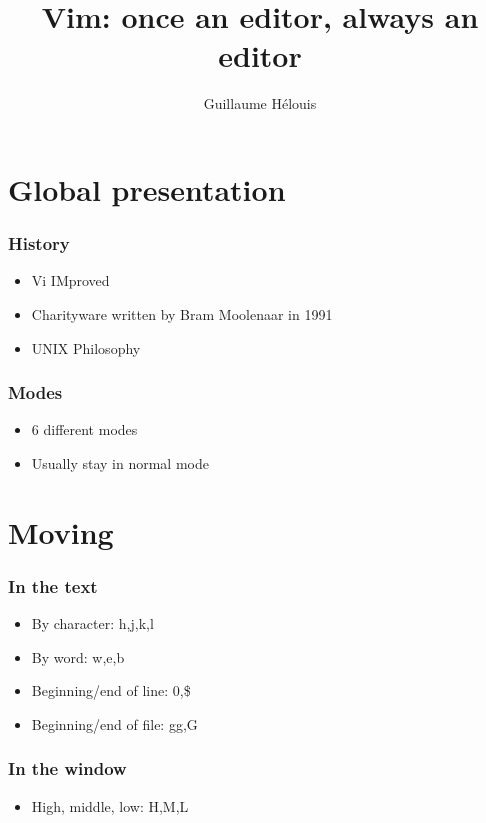\documentclass{beamer}
\title{Vim: once an editor, always an editor}
\author{Guillaume Hélouis}
\begin{document}
\begin{frame}
  \titlepage
\end{frame}

\section{Global presentation}
\begin{frame} \frametitle{History}
  \begin{itemize}
    \item Vi IMproved
    \item Charityware written by Bram Moolenaar in 1991
    \item UNIX Philosophy
  \end{itemize}
\end{frame}
\begin{frame} \frametitle{Modes}
  \begin{itemize}
    \item 6 different modes
    \item Usually stay in normal mode
  \end{itemize}
\end{frame}

\section{Moving}
\begin{frame} \frametitle{In the text}
  \begin{itemize}
    \item By character: h,j,k,l
    \item By word: w,e,b
    \item Beginning/end of line: 0,\$
    \item Beginning/end of file: gg,G
  \end{itemize}
\end{frame}
\begin{frame} \frametitle{In the window}
  \begin{itemize}
    \item High, middle, low: H,M,L
  \end{itemize}
\end{frame}
\end{document}
